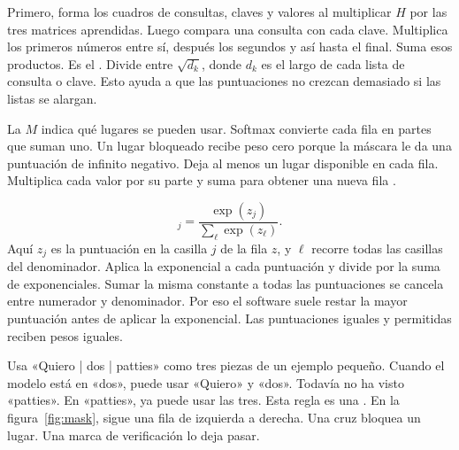 {Primero, forma los cuadros de consultas, claves y valores al multiplicar \(H\) por las tres matrices aprendidas. Luego compara una consulta con cada clave. Multiplica los primeros números entre sí, después los segundos y así hasta el final. Suma esos productos. Es el . Divide entre \(\sqrt{d_k}\), donde \(d_k\) es el largo de cada lista de consulta o clave. Esto ayuda a que las puntuaciones no crezcan demasiado si las listas se alargan.

La  \(M\) indica qué lugares se pueden usar. Softmax convierte cada fila en partes que suman uno. Un lugar bloqueado recibe peso cero porque la máscara le da una puntuación de infinito negativo. Deja al menos un lugar disponible en cada fila. Multiplica cada valor por su parte y suma para obtener una nueva fila \citep{transformer}.}

\begin{equation}
 [\softmax(z)]_j =\frac{\exp(z_j)}{\sum_\ell \exp(z_\ell)}.
 \label{eq:softmax}
\end{equation}
{Aquí \(z_j\) es la puntuación en la casilla \(j\) de la fila \(z\), y \(\ell\) recorre todas las casillas del denominador. Aplica la exponencial a cada puntuación y divide por la suma de exponenciales. Sumar la misma constante a todas las puntuaciones se cancela entre numerador y denominador. Por eso el software suele restar la mayor puntuación antes de aplicar la exponencial. Las puntuaciones iguales y permitidas reciben pesos iguales.}

{Usa «Quiero | dos | patties» como tres piezas de un ejemplo pequeño. Cuando el modelo está en «dos», puede usar «Quiero» y «dos». Todavía no ha visto «patties». En «patties», ya puede usar las tres. Esta regla es una . En la figura~\ref{fig:mask}, sigue una fila de izquierda a derecha. Una cruz bloquea un lugar. Una marca de verificación lo deja pasar.}

